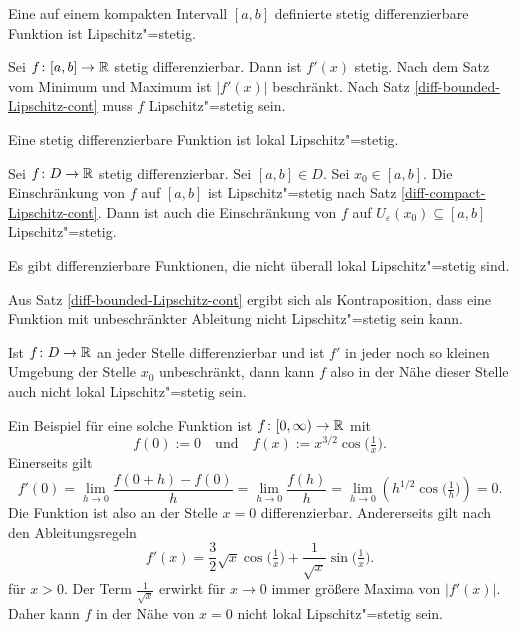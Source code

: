 \begin{Satz}\label{diff-compact-Lipschitz-cont}
Eine auf einem kompakten Intervall $[a,b]$ definierte stetig
differenzierbare Funktion ist Lipschitz"=stetig.
\end{Satz}
\begin{Beweis}
Sei $f\colon [a,b]\to\mathbb R$ stetig differenzierbar. Dann ist $f'(x)$ stetig.
Nach dem Satz vom Minimum und Maximum ist $|f'(x)|$ beschränkt. Nach
Satz \ref{diff-bounded-Lipschitz-cont} muss $f$ Lipschitz"=stetig
sein.\;\qedsymbol
\end{Beweis}

\begin{Satz}
Eine stetig differenzierbare Funktion ist lokal Lipschitz"=stetig.
\end{Satz}
\begin{Beweis}
Sei $f\colon D\to\mathbb R$ stetig differenzierbar. Sei $[a,b]\in D$. Sei
$x_0\in [a,b]$. Die Einschränkung von $f$ auf $[a,b]$ ist
Lipschitz"=stetig nach Satz \ref{diff-compact-Lipschitz-cont}.
Dann ist auch die Einschränkung von $f$ auf
$U_\varepsilon(x_0)\subseteq [a,b]$ Lipschitz"=stetig.\;\qedsymbol
\end{Beweis}

\begin{Satz}
Es gibt differenzierbare Funktionen, die nicht überall lokal
Lipschitz"=stetig sind.
\end{Satz}
\begin{Beweis}
Aus Satz \ref{diff-bounded-Lipschitz-cont} ergibt sich als
Kontraposition, dass eine Funktion mit unbeschränkter Ableitung
nicht Lipschitz"=stetig sein kann.

Ist $f\colon D\to\mathbb R$ an jeder Stelle differenzierbar und ist $f'$
in jeder noch so kleinen Umgebung der Stelle $x_0$ unbeschränkt, dann
kann $f$ also in der Nähe dieser Stelle auch nicht lokal
Lipschitz"=stetig sein.

Ein Beispiel für eine solche Funktion ist $f\colon{}[0,\infty)\to\mathbb R$
mit
\[f(0):=0\quad \text{und}\quad f(x):=x^{3/2}\cos\Big(\tfrac{1}{x}\Big).\]
Einerseits gilt
\[f'(0) = \lim_{h\to 0}\frac{f(0+h)-f(0)}{h} = \lim_{h\to 0}\frac{f(h)}{h}
= \lim_{h\to 0} (h^{1/2}\cos\Big(\tfrac{1}{h}\Big)) = 0.\]
Die Funktion ist also an der Stelle $x=0$ differenzierbar.
Andererseits gilt nach den Ableitungsregeln%
\[f'(x) = \frac{3}{2}\sqrt{x}\cos\Big(\tfrac{1}{x}\Big)+\frac{1}{\sqrt{x}}\sin\Big(\tfrac{1}{x}\Big).\]
für $x>0$. Der Term $\tfrac{1}{\sqrt{x}}$ erwirkt für $x\to 0$ immer
größere Maxima von $|f'(x)|$. Daher kann $f$ in der Nähe von $x=0$ nicht
lokal Lipschitz"=stetig sein.\;\qedsymbol
\end{Beweis}

